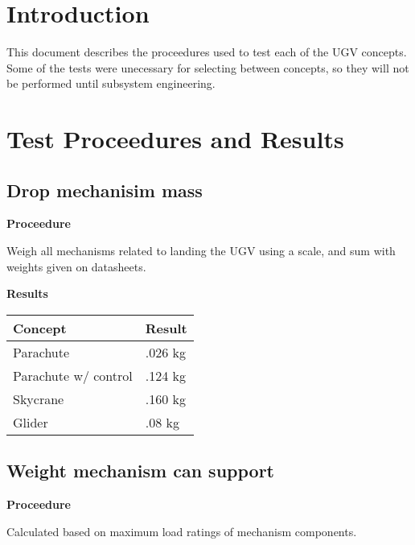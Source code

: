 \documentclass[]{auvsi_doc}
\begin{document}
\begin{AUVSITitlePage}
\begin{artifacttable}

\end{artifacttable}
\end{AUVSITitlePage}

\section{Introduction}
This document describes the proceedures used to test each of the UGV concepts.
Some of the tests were unecessary for selecting between concepts, so they will not be performed until subsystem engineering.

\section {Test Proceedures and Results}
	\subsection{Drop mechanisim mass}
	\textbf{Proceedure}

	Weigh all mechanisms related to landing the UGV using a scale, and sum with weights given on datasheets.

	\textbf{Results} 

	\begin{tabular}{|l|l|}
		\hline
		\textbf{Concept}       & \textbf{Result} \\
		\hline
		Parachute              & .026 kg                \\
		Parachute w/ control   & .124 kg                \\
		Skycrane               & .160 kg                \\
		Glider                 & .08 kg				 \\
		\hline
	\end{tabular}

	\subsection{Weight mechanism can support}
	\textbf{Proceedure}
	
	Calculated based on maximum load ratings of mechanism components.
\end{document}

